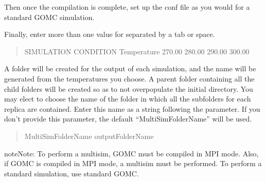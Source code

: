 \documentclass[letterpaper,10pt,english]{sphinxmanual}
\begin{document}
\sphinxAtStartPar
Then once the compilation is complete, set up the conf file as you would for a standard GOMC simulation.

\sphinxAtStartPar
Finally, enter more than one value for  separated by a tab or space.
\begin{quote}

\begin{sphinxVerbatim}[commandchars=\\\{\}]
\PYGZsh{}\PYGZsh{}\PYGZsh{}\PYGZsh{}\PYGZsh{}\PYGZsh{}\PYGZsh{}\PYGZsh{}\PYGZsh{}\PYGZsh{}\PYGZsh{}\PYGZsh{}\PYGZsh{}\PYGZsh{}\PYGZsh{}\PYGZsh{}\PYGZsh{}\PYGZsh{}\PYGZsh{}\PYGZsh{}\PYGZsh{}\PYGZsh{}\PYGZsh{}\PYGZsh{}\PYGZsh{}\PYGZsh{}\PYGZsh{}\PYGZsh{}\PYGZsh{}\PYGZsh{}\PYGZsh{}\PYGZsh{}\PYGZsh{}
\PYGZsh{} SIMULATION CONDITION
\PYGZsh{}\PYGZsh{}\PYGZsh{}\PYGZsh{}\PYGZsh{}\PYGZsh{}\PYGZsh{}\PYGZsh{}\PYGZsh{}\PYGZsh{}\PYGZsh{}\PYGZsh{}\PYGZsh{}\PYGZsh{}\PYGZsh{}\PYGZsh{}\PYGZsh{}\PYGZsh{}\PYGZsh{}\PYGZsh{}\PYGZsh{}\PYGZsh{}\PYGZsh{}\PYGZsh{}\PYGZsh{}\PYGZsh{}\PYGZsh{}\PYGZsh{}\PYGZsh{}\PYGZsh{}\PYGZsh{}\PYGZsh{}\PYGZsh{}
Temperature   270.00    280.00    290.00    300.00
\end{sphinxVerbatim}
\end{quote}

\sphinxAtStartPar
A folder will be created for the output of each simulation, and the name will be generated from the temperatures you choose.
A parent folder containing all the child folders will be created so as to not overpopulate the initial directory.
You may elect to choose the name of the folder in which all the sub\sphinxhyphen{}folders for each replica are contained.
Enter this name as a string following the  parameter.  If you don’t provide this parameter, the default “MultiSimFolderName” will be used.
\begin{quote}

\begin{sphinxVerbatim}[commandchars=\\\{\}]
MultiSimFolderName  outputFolderName
\end{sphinxVerbatim}
\end{quote}

\begin{sphinxadmonition}{note}{Note:}
\sphinxAtStartPar
To perform a multisim, GOMC must be compiled in MPI mode.  Also, if GOMC is compiled in MPI mode, a multisim must be performed.  To perform a standard simulation, use standard GOMC.
\end{sphinxadmonition}
\end{document}
